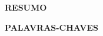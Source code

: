 \newpage
\thispagestyle{empty}
\begin{center}
    \uppercase{\textbf{Resumo}}
\end{center}

\begin{center}
    \uppercase{\textbf{Palavras-chaves}}
\end{center}

